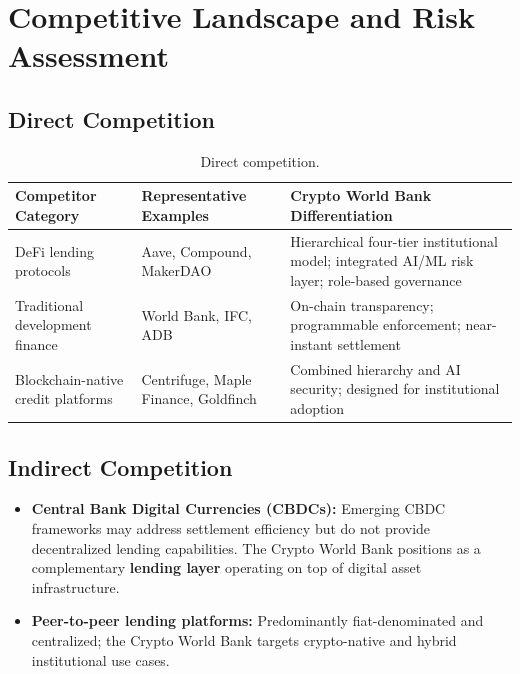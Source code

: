 \documentclass[11pt,a4paper]{article}
\newcommand{\tableheadfont}{\bfseries\small\color{PrimaryBlue}}
\newenvironment{moderntable}[1][H]{%
    \begin{table}[#1]\centering\small%
    \renewcommand{\arraystretch}{1.35}%
}{%
    \end{table}%
}
\begin{document}
\section{Competitive Landscape and Risk Assessment}

\subsection{Direct Competition}

\begin{moderntable}
\caption{Direct competition.}
\begin{tabular}{@{} >{\raggedright}p{2.8cm} >{\raggedright}p{3.4cm} >{\raggedright\arraybackslash}p{5.5cm} @{}}
\toprule
\tableheadfont Competitor Category & \tableheadfont Representative Examples & \tableheadfont Crypto World Bank Differentiation \\
\midrule
\rowcolor{RowShade}
DeFi lending protocols & Aave, Compound, MakerDAO & Hierarchical four-tier institutional model; integrated AI/ML risk layer; role-based governance \\
Traditional development finance & World Bank, IFC, ADB & On-chain transparency; programmable enforcement; near-instant settlement \\
\rowcolor{RowShade}
Blockchain-native credit platforms & Centrifuge, Maple Finance, Goldfinch & Combined hierarchy and AI security; designed for institutional adoption \\
\bottomrule
\end{tabular}
\end{moderntable}

\subsection{Indirect Competition}

\begin{itemize}[noitemsep]
\item \textbf{Central Bank Digital Currencies (CBDCs):} Emerging CBDC frameworks may address settlement efficiency but do not provide decentralized lending capabilities. The Crypto World Bank positions as a complementary \textbf{lending layer} operating on top of digital asset infrastructure.
\item \textbf{Peer-to-peer lending platforms:} Predominantly fiat-denominated and centralized; the Crypto World Bank targets crypto-native and hybrid institutional use cases.
\end{itemize}
\end{document}
